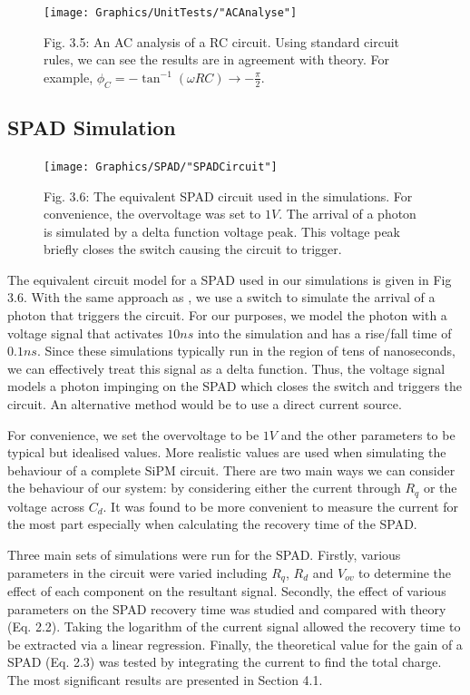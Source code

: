 \begin{figure}[h]
  \texttt{[image: Graphics/UnitTests/"ACAnalyse"]}
  {\caption*{Fig. 3.5: An AC analysis of a RC circuit. Using standard circuit rules, we can see the results are in agreement with theory. For example, $\phi_C=-\tan^{-1}(\omega RC)\to -\frac{\pi}{2}$.}}
\end{figure}

\subsection{SPAD Simulation}

\begin{figure}[h]
  \centering
  \texttt{[image: Graphics/SPAD/"SPADCircuit"]}
  {\caption*{Fig. 3.6: The equivalent SPAD circuit used in the simulations. For convenience, the overvoltage was set to $1V$. The arrival of a photon is simulated by a delta function voltage peak. This voltage peak briefly closes the switch causing the circuit to trigger.}}
\end{figure}

The equivalent circuit model for a SPAD used in our simulations is given in Fig 3.6. With the same approach as \cite{acerbi2019}, we use a switch to simulate the arrival of a photon that triggers the circuit. For our purposes, we model the photon with a voltage signal that activates $10ns$ into the simulation and has a rise/fall time of $0.1ns$. Since these simulations typically run in the region of tens of nanoseconds, we can effectively treat this signal as a delta function. Thus, the voltage signal models a photon impinging on the SPAD which closes the switch and triggers the circuit. An alternative method would be to use a direct current source. \cite{corsi2006}

For convenience, we set the overvoltage to be $1V$ and the other parameters to be typical but idealised values. More realistic values are used when simulating the behaviour of a complete SiPM circuit. There are two main ways we can consider the behaviour of our system: by considering either the current through $R_q$ or the voltage across $C_d$. It was found to be more convenient to measure the current for the most part especially when calculating the recovery time of the SPAD.

Three main sets of simulations were run for the SPAD. Firstly, various parameters in the circuit were varied including $R_q$, $R_d$ and $V_{ov}$ to determine the effect of each component on the resultant signal. Secondly, the effect of various parameters on the SPAD recovery time was studied and compared with theory (Eq. 2.2). Taking the logarithm of the current signal allowed the recovery time to be extracted via a linear regression. Finally, the theoretical value for the gain of a SPAD (Eq. 2.3) was tested by integrating the current to find the total charge. The most significant results are presented in Section 4.1.

